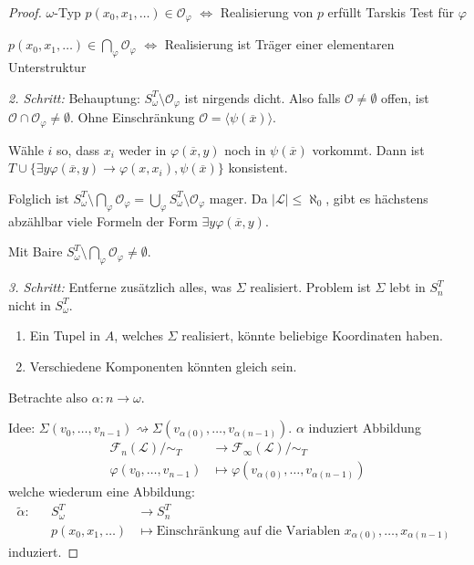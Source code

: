 \documentclass[12pt,parskip=full]{scrartcl}
\newcommand{\abs}[1]{{\left| #1 \right|}}
\theoremstyle{definition}
\begin{document}
\begin{proof}
		$\omega$-Typ $p(x_0, x_1, \dots) \in \mathcal{O}_\varphi$ $\Leftrightarrow$ Realisierung von $p$ erfüllt Tarskis Test für $\varphi$
		
		$p(x_0, x_1, \dots) \in \bigcap_\varphi \mathcal{O}_\varphi$ $\Leftrightarrow$ Realisierung ist Träger einer elementaren Unterstruktur
		
		\textit{2. Schritt:} Behauptung: $S_\omega^T \setminus \mathcal{O}_\varphi$ ist nirgends dicht. Also falls $\mathcal{O} \neq \emptyset$ offen, ist $\mathcal{O} \cap \mathcal{O}_\varphi \neq \emptyset$. Ohne Einschränkung $\mathcal{O} = \langle \psi(\overline{x}) \rangle$.
		
		Wähle $i$ so, dass $x_i$ weder in $\varphi(\overline{x}, y)$ noch in $\psi(\overline{x})$ vorkommt. Dann ist $T \cup \{ \exists y \varphi(\overline{x},y) \rightarrow \varphi(x, x_i), \psi(\overline{x}) \}$ konsistent.
		
		Folglich ist $S_\omega^T \setminus \bigcap_\varphi \mathcal{O}_\varphi = \bigcup_\varphi S_\omega^T \setminus \mathcal{O}_\varphi$ mager. Da $\abs{\mathcal{L}} \leq \aleph_0$, gibt es hächstens abzählbar viele Formeln der Form $\exists y \varphi(\overline{x}, y)$.
		
		Mit Baire $S_\omega^T \setminus \bigcap_\varphi \mathcal{O}_\varphi \neq \emptyset$.
		
		\textit{3. Schritt:} Entferne zusätzlich alles, was $\Sigma$ realisiert. Problem ist $\Sigma$ lebt in $S_n^T$ nicht in $S_\omega^T$.
		\begin{enumerate}
			\item Ein Tupel in $A$, welches $\Sigma$ realisiert, könnte beliebige Koordinaten haben.
			\item Verschiedene Komponenten könnten gleich sein.
		\end{enumerate}
	
		Betrachte also $\alpha: n \to \omega$.
		
		Idee: $\Sigma(v_0, \dots, v_{n-1}) \rightsquigarrow \Sigma(v_{\alpha(0)}, \dots, v_{\alpha(n-1)})$. $\alpha$ induziert Abbildung
		\begin{align*}
			\mathcal{F}_n(\mathcal{L})/ \sim_T &\longrightarrow \mathcal{F}_\infty(\mathcal{L}) / \sim_T \\
			\varphi(v_0, \dots, v_{n-1}) &\longmapsto \varphi(v_{\alpha(0)}, \dots, v_{\alpha(n-1)})
		\end{align*}
		welche wiederum eine Abbildung:
		\begin{align*}
			\tilde{\alpha}:&& S_\omega^T &\longrightarrow S_n^T \\
			&&p(x_0, x_1, \dots) &\longmapsto \text{Einschränkung auf die Variablen $x_{\alpha(0)}, \dots, x_{\alpha(n-1)}$ }
		\end{align*}
		induziert.
		

\end{proof}
\end{document}
